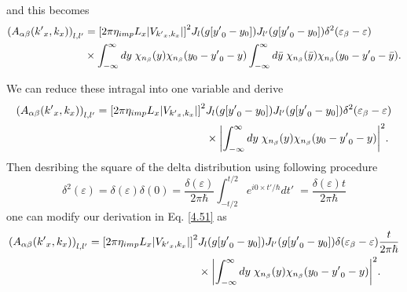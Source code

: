 and this becomes
\begin{equation} \label{4.51}
  \begin{aligned}
      \qty(A_{\alpha\beta}({k'}_x,k_x))_{l,l'} & =
      \qty[{ 2 \pi \eta_{imp} L_x |V_{{k'}_x,k_x}|}]^2
      J_l\qty(g[{y'}_0 - y_0]) J_{l'}\qty(g[{y'}_0 - y_0])
      \delta^2(\varepsilon_{\beta} - \varepsilon) \\
      & \times
      \int_{-\infty}^{\infty} dy \;
      {\chi}_{n_{\beta}}\qty(y)
      {\chi}_{n_{\beta}}\qty(y_0 - {y'}_0 - y)
      \int_{-\infty}^{\infty} d\bar{y} \;
      {\chi}_{n_{\beta}}\qty(\bar{y})
      {\chi}_{n_{\beta}}\qty(y_0 - {y'}_0 - \bar{y}).
  \end{aligned}
\end{equation}

\noindent
We can reduce these intragal into one variable and derive
\begin{equation} \label{4.52}
  \begin{aligned}
      \qty(A_{\alpha\beta}({k'}_x,k_x))_{l,l'} =
      \qty[{ 2 \pi \eta_{imp} L_x |V_{{k'}_x,k_x}|}]^2 &
      J_l\qty(g[{y'}_0 - y_0]) J_{l'}\qty(g[{y'}_0 - y_0])
      \delta^2(\varepsilon_{\beta} - \varepsilon) \\
      & \times
      \qty|
      \int_{-\infty}^{\infty} dy \;
      {\chi}_{n_{\beta}}\qty(y)
      {\chi}_{n_{\beta}}\qty(y_0 - {y'}_0 - y)|^2.
  \end{aligned}
\end{equation}
Then desribing the square of the delta distribution using following procedure
\begin{equation} \label{4.53}
    \delta^2(\varepsilon) =
    \delta(\varepsilon)\delta(0) =
    \frac{\delta(\varepsilon)}{2\pi \hbar}
    \int_{-t/2}^{t/2} e^{i0\times t'/\hbar} dt'\; =
    \frac{\delta(\varepsilon)t}{2\pi \hbar}
\end{equation}
one can modify our derivation in Eq. \eqref{4.51} as
\begin{equation} \label{4.54}
  \begin{aligned}
      \qty(A_{\alpha\beta}({k'}_x,k_x))_{l,l'} =
      \qty[{ 2 \pi \eta_{imp} L_x |V_{{k'}_x,k_x}|}]^2 &
      J_l\qty(g[{y'}_0 - y_0]) J_{l'}\qty(g[{y'}_0 - y_0])
      \delta(\varepsilon_{\beta} - \varepsilon)
      \frac{t}{2\pi \hbar}\\
      & \times
      \qty|
      \int_{-\infty}^{\infty} dy \;
      {\chi}_{n_{\beta}}\qty(y)
      {\chi}_{n_{\beta}}\qty(y_0 - {y'}_0 - y)|^2.
  \end{aligned}
\end{equation}
